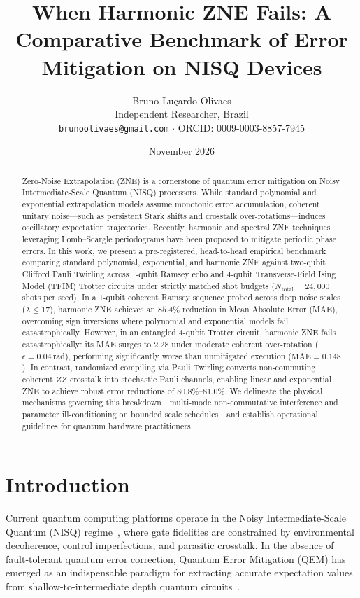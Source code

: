 \documentclass[10pt,twocolumn,a4paper]{article}
\title{\textbf{When Harmonic ZNE Fails: A Comparative Benchmark of Error Mitigation on NISQ Devices}}
\author{Bruno Lu\c{c}ardo Olivaes \\ \small Independent Researcher, Brazil \\ \small \texttt{brunoolivaes@gmail.com} $\cdot$ ORCID: 0009-0003-8857-7945}
\date{November 2026}
\begin{document}
\maketitle

\begin{abstract}
\noindent Zero-Noise Extrapolation (ZNE) is a cornerstone of quantum error mitigation on Noisy Intermediate-Scale Quantum (NISQ) processors. While standard polynomial and exponential extrapolation models assume monotonic error accumulation, coherent unitary noise—such as persistent Stark shifts and crosstalk over-rotations—induces oscillatory expectation trajectories. Recently, harmonic and spectral ZNE techniques leveraging Lomb--Scargle periodograms have been proposed to mitigate periodic phase errors. In this work, we present a pre-registered, head-to-head empirical benchmark comparing standard polynomial, exponential, and harmonic ZNE against two-qubit Clifford Pauli Twirling across 1-qubit Ramsey echo and 4-qubit Transverse-Field Ising Model (TFIM) Trotter circuits under strictly matched shot budgets ($N_{\mathrm{total}} = 24{,}000$ shots per seed). In a 1-qubit coherent Ramsey sequence probed across deep noise scales ($\lambda \le 17$), harmonic ZNE achieves an $85.4\%$ reduction in Mean Absolute Error (MAE), overcoming sign inversions where polynomial and exponential models fail catastrophically. However, in an entangled 4-qubit Trotter circuit, harmonic ZNE fails catastrophically: its MAE surges to $2.28$ under moderate coherent over-rotation ($\epsilon = 0.04\,$rad), performing significantly worse than unmitigated execution ($\mathrm{MAE} = 0.148$). In contrast, randomized compiling via Pauli Twirling converts non-commuting coherent $ZZ$ crosstalk into stochastic Pauli channels, enabling linear and exponential ZNE to achieve robust error reductions of $80.8\%\text{--}81.0\%$. We delineate the physical mechanisms governing this breakdown—multi-mode non-commutative interference and parameter ill-conditioning on bounded scale schedules—and establish operational guidelines for quantum hardware practitioners.
\end{abstract}

\section{Introduction}
Current quantum computing platforms operate in the Noisy Intermediate-Scale Quantum (NISQ) regime~\cite{preskill2018}, where gate fidelities are constrained by environmental decoherence, control imperfections, and parasitic crosstalk. In the absence of fault-tolerant quantum error correction, Quantum Error Mitigation (QEM) has emerged as an indispensable paradigm for extracting accurate expectation values from shallow-to-intermediate depth quantum circuits~\cite{temme2017,li2017,cai2023}.
\end{document}
